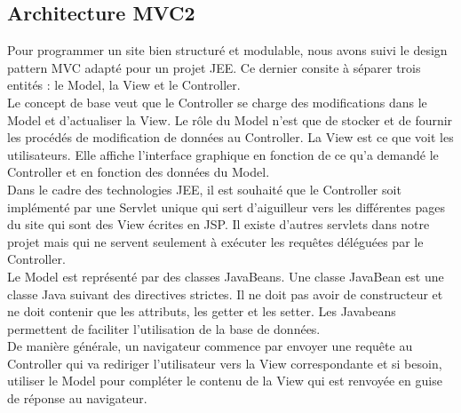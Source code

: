 \subsection{Architecture MVC2}

Pour programmer un site bien structuré et modulable, nous avons suivi le 
design pattern MVC adapté pour un projet JEE. Ce dernier consite à séparer trois 
entités : le Model, la View et le Controller. \\

Le concept de base veut que le Controller se charge des modifications dans le 
Model et d'actualiser la View. Le rôle du Model n'est que de stocker et de 
fournir les procédés de modification de données au Controller. La View est ce 
que voit les utilisateurs. Elle affiche l'interface graphique en fonction de ce 
qu'a demandé le Controller et en fonction des données du Model. \\

Dans le cadre des technologies JEE, il est souhaité que le Controller soit 
implémenté par une Servlet unique qui sert d'aiguilleur vers les différentes 
pages du site qui sont des View écrites en JSP. Il existe d'autres servlets 
dans notre projet mais qui ne servent seulement à exécuter les requêtes 
déléguées par le Controller.\\

Le Model est représenté par des classes JavaBeans. Une classe JavaBean est une 
classe Java suivant des directives strictes. Il ne doit pas avoir de 
constructeur et ne doit contenir que les attributs, les getter et les setter. 
Les Javabeans permettent de faciliter l'utilisation de la base de données. \\

De manière générale, un navigateur commence par envoyer une requête au 
Controller qui va rediriger l'utilisateur vers la View correspondante et si 
besoin, utiliser le Model pour compléter le contenu de la View qui est renvoyée 
en guise de réponse au navigateur.
